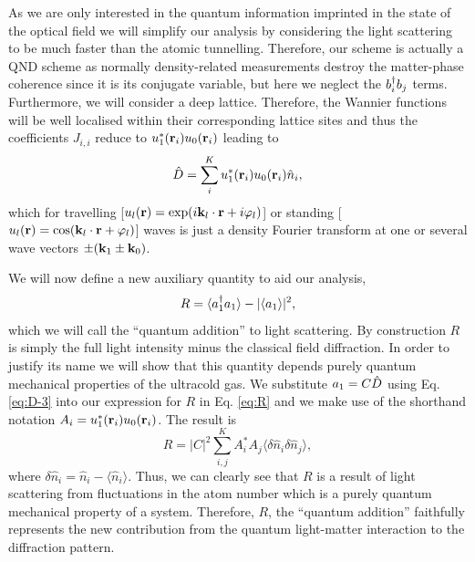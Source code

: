 As we are only interested in the quantum information imprinted in the
state of the optical field we will simplify our analysis by
considering the light scattering to be much faster than the atomic
tunnelling. Therefore, our scheme is actually a QND scheme
\cite{rogers2014, mekhov2007prl, mekhov2007pra, eckert2008} as
normally density-related measurements destroy the matter-phase
coherence since it is its conjugate variable, but here we neglect the
$b^\dagger_i b_j$ terms. Furthermore, we will consider a deep
lattice. Therefore, the Wannier functions will be well localised
within their corresponding lattice sites and thus the coefficients
$J_{i,i}$ reduce to $u_1^*(\mathbf{r}_i) u_0(\mathbf{r}_i)$ leading to
\begin{equation}
  \label{eq:D-3}
  \hat{D}=\sum_i^K u_1^*(\mathbf{r}_i) u_0(\mathbf{r}_i) \hat{n}_i,
\end{equation} 
which for travelling
[$u_l(\mathbf{r})=\exp(i \mathbf{k}_l \cdot \mathbf{r}+i\varphi_l)$] or standing
[$u_l(\mathbf{r})=\cos(\mathbf{k}_l \cdot \mathbf{r}+\varphi_l)$] waves is just a
density Fourier transform at one or several wave vectors
$\pm(\mathbf{k}_1 \pm \mathbf{k}_0)$. 

We will now define a new auxiliary quantity to aid our analysis,
\begin{equation}
  \label{eq:R}
  R = \langle a^\dagger_1 a_1 \rangle - | \langle a_1 \rangle |^2,
\end{equation}
which we will call the ``quantum addition'' to light scattering. By
construction $R$ is simply the full light intensity minus the
classical field diffraction. In order to justify its name we will show
that this quantity depends purely quantum mechanical properties of the
ultracold gas. We substitute $a_1 = C \hat{D}$ using
Eq. \eqref{eq:D-3} into our expression for $R$ in Eq. \eqref{eq:R} and
we make use of the shorthand notation
$A_i = u_1^*(\mathbf{r}_i) u_0(\mathbf{r}_i)$. The result is
\begin{equation}
  \label{eq:Rfluc}
  R = |C|^2 \sum_{i,j}^K A^*_i A_j \langle \delta \hat{n}_i \delta
  \hat{n}_j \rangle,
\end{equation}
where $\delta \hat{n}_i = \hat{n}_i - \langle \hat{n}_i
\rangle$. Thus, we can clearly see that $R$ is a result of light
scattering from fluctuations in the atom number which is a purely
quantum mechanical property of a system. Therefore, $R$, the ``quantum
addition'' faithfully represents the new contribution from the quantum
light-matter interaction to the diffraction pattern.

